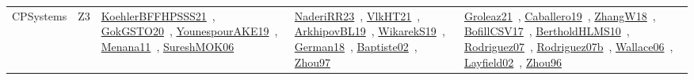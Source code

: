 {\begin{longtable}{lp{3cm}>{\raggedright\arraybackslash}p{6cm}>{\raggedright\arraybackslash}p{6cm}>{\raggedright\arraybackslash}p{8cm}}
CPSystems & Z3 & \href{../works/KoehlerBFFHPSSS21.pdf}{KoehlerBFFHPSSS21}~\cite{KoehlerBFFHPSSS21}, \href{../works/GokGSTO20.pdf}{GokGSTO20}~\cite{GokGSTO20}, \href{../works/YounespourAKE19.pdf}{YounespourAKE19}~\cite{YounespourAKE19}, \href{../works/Menana11.pdf}{Menana11}~\cite{Menana11}, \href{../works/SureshMOK06.pdf}{SureshMOK06}~\cite{SureshMOK06} & \href{../works/NaderiRR23.pdf}{NaderiRR23}~\cite{NaderiRR23}, \href{../works/VlkHT21.pdf}{VlkHT21}~\cite{VlkHT21}, \href{../works/ArkhipovBL19.pdf}{ArkhipovBL19}~\cite{ArkhipovBL19}, \href{../works/WikarekS19.pdf}{WikarekS19}~\cite{WikarekS19}, \href{../works/German18.pdf}{German18}~\cite{German18}, \href{../works/Baptiste02.pdf}{Baptiste02}~\cite{Baptiste02}, \href{../works/Zhou97.pdf}{Zhou97}~\cite{Zhou97} & \href{../works/Groleaz21.pdf}{Groleaz21}~\cite{Groleaz21}, \href{../works/Caballero19.pdf}{Caballero19}~\cite{Caballero19}, \href{../works/ZhangW18.pdf}{ZhangW18}~\cite{ZhangW18}, \href{../works/BofillCSV17.pdf}{BofillCSV17}~\cite{BofillCSV17}, \href{../works/BertholdHLMS10.pdf}{BertholdHLMS10}~\cite{BertholdHLMS10}, \href{../works/Rodriguez07.pdf}{Rodriguez07}~\cite{Rodriguez07}, \href{../works/Rodriguez07b.pdf}{Rodriguez07b}~\cite{Rodriguez07b}, \href{../works/Wallace06.pdf}{Wallace06}~\cite{Wallace06}, \href{../works/Layfield02.pdf}{Layfield02}~\cite{Layfield02}, \href{../works/Zhou96.pdf}{Zhou96}~\cite{Zhou96}\\
\end{longtable}
}


